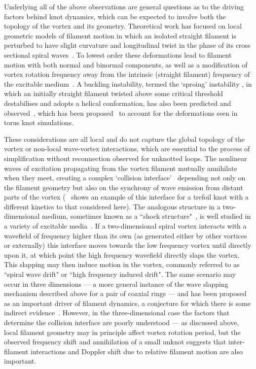 Underlying all of the above observations are general questions as to the driving factors behind knot dynamics, which can be expected to involve both the topology of the vortex and its geometry. 
Theoretical work has focused on local geometric models of filament motion in which an isolated straight filament is perturbed to have slight curvature and longitudinal twist in the phase of its cross sectional spiral waves~\citep{Keener1988,Keener1992,Henry2002,Biktashev1994,Echebarria2006,Dierckx2010}. To lowest order these deformations lead to filament motion with both normal and binormal components, as well as a modification of vortex rotation frequency away from the intrinsic (straight filament) frequency of the excitable medium~\citep{Keener1988,Biktashev1994,Dierckx2010}. A buckling instability, termed the `sproing' instability \citep{Henze1993}, in which an initially straight filament twisted above some critical threshold destabilises and adopts a helical conformation, has also been predicted and observed~\citep{Keener1988,Henze1993,Henry2002,Echebarria2006, Dierckx2010}, which has been proposed~\citep{Maucher2017} to account for the deformations seen in torus knot simulations. 

These considerations are all local and do not capture the global topology of the vortex or non-local wave-vortex interactions, which are essential to the process of simplification without reconnection observed for unknotted loops. The nonlinear waves of excitation propagating from the vortex filament mutually annihilate when they meet, creating a complex `collision interface'~\citep{Winfree1990, Henze1991, Henze1993, WinfreeChapter, Sutcliffe2003} depending not only on the filament geometry but also on the synchrony of wave emission from distant parts of the vortex (~\citep{Henze1991} shows an example of this interface for a trefoil knot with a different kinetics to that considered here). The analogous structure in a two-dimensional medium, sometimes known as a ``shock structure"~\citep{Kopell1973}, is well studied in a variety of excitable media~\citep{Krinsky1983,Ermakova1986,Vinson1998,Gottwald2001,Agladze2007,Steinbock2011}. If a two-dimensional spiral vortex interacts with a wavefield of frequency higher than its own (as generated either by other vortices or externally) this interface moves towards the low frequency vortex until directly upon it, at which point the high frequency wavefield directly slaps the vortex. This slapping may then induce motion in the vortex, commonly referred to as ``spiral wave drift" or ``high frequency induced drift". The same scenario may occur in three dimensions --- a more general instance of the wave slapping mechanism described above for a pair of coaxial rings --- and has been proposed as an important driver of filament dynamics, a conjecture for which there is some indirect evidence~\citep{WinfreeChapter, Sutcliffe2003,Maucher2019}. However, in the three-dimensional case the factors that determine the collision interface are poorly understood --- as discussed above, local filament geometry may in principle affect vortex rotation period, but the observed frequency shift and annihilation of a small unknot suggests that inter-filament interactions and Doppler shift due to relative filament motion are also important.

